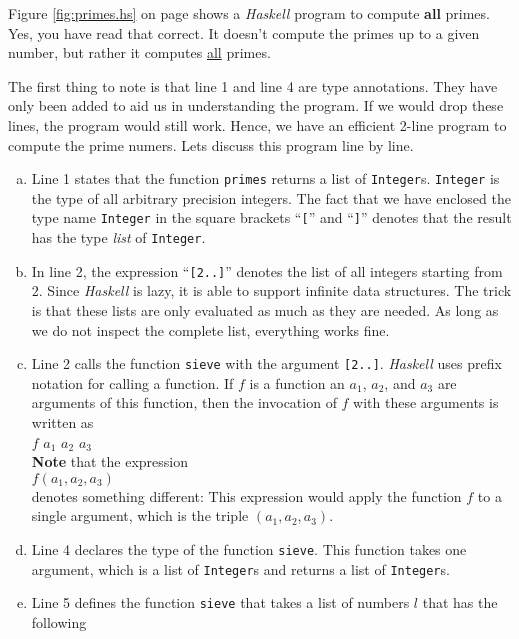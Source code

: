 \documentclass[11pt]{report}
\begin{document}
Figure \ref{fig:primes.hs} on page \pageref{fig:primes.hs} shows a \textsl{Haskell} program to compute \textbf{all}
primes.  Yes, you have read that correct.  It doesn't compute the primes up to a given number, but rather it
computes \underline{all} primes.

The first thing to note is that line 1 and line 4 are type annotations.  They have only
been added to aid us in understanding the program.  If we would drop these lines, the program would still
work.  Hence, we have an efficient 2-line program to compute the prime numers.  Lets discuss this program line
by line. 
\begin{enumerate}[(a)]
\item Line 1 states that the function \texttt{primes} returns a list of \texttt{Integer}s.
  \texttt{Integer} is the type of all arbitrary precision integers.  The fact that we have enclosed
  the type name \texttt{Integer} in the square brackets ``\texttt{[}'' and ``\texttt{]}'' denotes that the
  result has the type \textsl{list} of \texttt{Integer}.
\item In line 2, the expression ``\texttt{[2..]}''  denotes the list of all integers starting from $2$.  Since
  \textsl{Haskell} is lazy, it is able to support infinite data structures.  The trick is that these lists are
  only evaluated as much as they are needed.  As long as we do not inspect the complete list, everything works
  fine. 
\item Line 2 calls the function \texttt{sieve} with the argument \texttt{[2..]}.  \textsl{Haskell} uses prefix
  notation for calling a function.  If $f$ is a function an $a_1$, $a_2$, and $a_3$ are arguments of this
  function, then the invocation of $f$ with these arguments is written as
  \\[0.2cm]
  \hspace*{1.3cm}
  $f$ $a_1$ $a_2$ $a_3$
  \\[0.2cm]
  \textbf{Note} that the expression
  \\[0.2cm]
  \hspace*{1.3cm}
  $f(a_1, a_2, a_3)$
  \\[0.2cm]
  denotes something different:  This expression would apply the function $f$ to a single argument, which is the
  triple $(a_1, a_2, a_3)$.
\item Line 4 declares the type of the function \texttt{sieve}.  This function takes one argument, which is a
  list of \texttt{Integer}s and returns a list of \texttt{Integer}s.
\item Line 5 defines the function \texttt{sieve} that takes a list of numbers $l$ that has the following

\end{enumerate}
\end{document}
